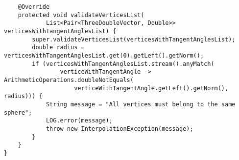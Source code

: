 \begin{verbatim}
    @Override
    protected void validateVerticesList(
            List<Pair<ThreeDoubleVector, Double>> verticesWithTangentAnglesList) {
        super.validateVerticesList(verticesWithTangentAnglesList);
        double radius = verticesWithTangentAnglesList.get(0).getLeft().getNorm();
        if (verticesWithTangentAnglesList.stream().anyMatch(
                verticeWithTangentAngle -> ArithmeticOperations.doubleNotEquals(
                    verticeWithTangentAngle.getLeft().getNorm(), radius))) {
            String message = "All vertices must belong to the same sphere";
            LOG.error(message);
            throw new InterpolationException(message);
        }
    }
}
\end{verbatim}
